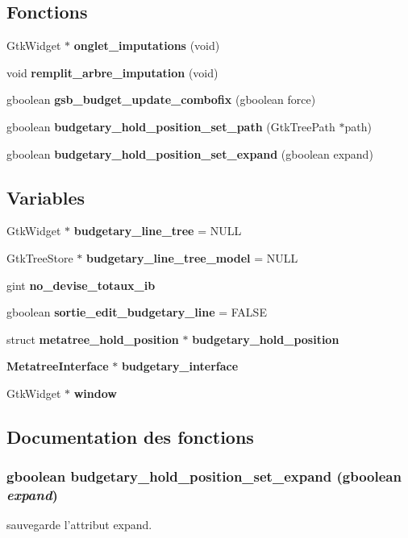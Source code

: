 \subsection*{Fonctions}
\begin{DoxyCompactItemize}
\item 
GtkWidget $\ast$ {\bf onglet\_\-imputations} (void)
\item 
void {\bf remplit\_\-arbre\_\-imputation} (void)
\item 
gboolean {\bf gsb\_\-budget\_\-update\_\-combofix} (gboolean force)
\item 
gboolean {\bf budgetary\_\-hold\_\-position\_\-set\_\-path} (GtkTreePath $\ast$path)
\item 
gboolean {\bf budgetary\_\-hold\_\-position\_\-set\_\-expand} (gboolean expand)
\end{DoxyCompactItemize}
\subsection*{Variables}
\begin{DoxyCompactItemize}
\item 
GtkWidget $\ast$ {\bf budgetary\_\-line\_\-tree} = NULL
\item 
GtkTreeStore $\ast$ {\bf budgetary\_\-line\_\-tree\_\-model} = NULL
\item 
gint {\bf no\_\-devise\_\-totaux\_\-ib}
\item 
gboolean {\bf sortie\_\-edit\_\-budgetary\_\-line} = FALSE
\item 
struct {\bf metatree\_\-hold\_\-position} $\ast$ {\bf budgetary\_\-hold\_\-position}
\item 
{\bf MetatreeInterface} $\ast$ {\bf budgetary\_\-interface}
\item 
GtkWidget $\ast$ {\bf window}
\end{DoxyCompactItemize}


\subsection{Documentation des fonctions}
\subsubsection[{budgetary\_\-hold\_\-position\_\-set\_\-expand}]{\setlength{\rightskip}{0pt plus 5cm}gboolean budgetary\_\-hold\_\-position\_\-set\_\-expand (gboolean {\em expand})}\label{imputation__budgetaire_8c_a3266a447db85ea0aff52f82aa54bbbd8}
sauvegarde l'attribut expand.


